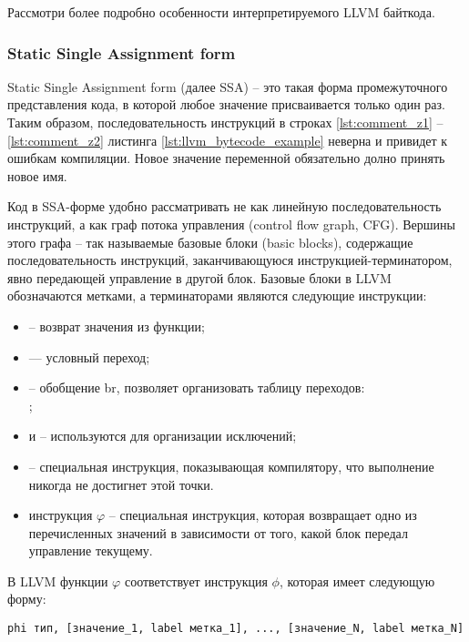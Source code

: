 Рассмотри более подробно особенности интерпретируемого LLVM байткода.

\subsubsection{Static Single Assignment form}

Static Single Assignment form (далее SSA) -- это такая форма промежуточного представления кода,
в которой любое значение присваивается только один раз. Таким образом, последовательность инструкций
в строках \ref{lst:comment_z1} -- \ref{lst:comment_z2} листинга \ref{lst:llvm_bytecode_example} неверна
и привидет к ошибкам компиляции. Новое значение переменной обязательно долно принять новое имя.

Код в SSA-форме удобно рассматривать не как линейную последовательность инструкций,
а как граф потока управления (control flow graph, CFG). Вершины этого графа -- так
называемые базовые блоки (basic blocks), содержащие последовательность инструкций,
заканчивающуюся инструкцией-терминатором, явно передающей управление в другой блок.
Базовые блоки в LLVM обозначаются метками, а терминаторами являются следующие инструкции:
\begin{itemize}
    \item {} -- возврат значения из функции;
    \item {} — условный переход;
    \item {} -- обобщение br, позволяет организовать таблицу переходов:\\
        ;
    \item {} и  -- используются для организации исключений;
    \item {} -- специальная инструкция, показывающая компилятору, что выполнение никогда не достигнет этой точки.
    \item инструкция $\varphi$ -- специальная инструкция, которая возвращает одно из перечисленных значений в зависимости от того,
        какой блок передал управление текущему.
\end{itemize}

В LLVM функции $\varphi$ соответствует инструкция $\phi$, которая имеет следующую форму:
\begin{verbatim}
phi тип, [значение_1, label метка_1], ..., [значение_N, label метка_N]
\end{verbatim}


